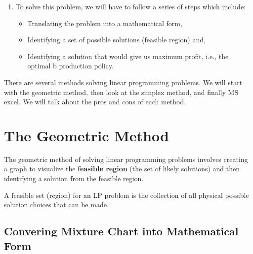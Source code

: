 \documentclass[
  letterpaper,
  DIV=11,
  numbers=noendperiod]{scrreprt}
\newenvironment{Shaded}{\begin{snugshade}}{\end{snugshade}}
\newcommand{\DataTypeTok}[1]{\textcolor[rgb]{0.68,0.00,0.00}{#1}}
\newcommand{\ErrorTok}[1]{\textcolor[rgb]{0.68,0.00,0.00}{#1}}
\newcommand{\KeywordTok}[1]{\textcolor[rgb]{0.00,0.23,0.31}{#1}}
\providecommand{\tightlist}{%
  \setlength{\itemsep}{0pt}\setlength{\parskip}{0pt}}\usepackage{longtable,booktabs,array}
\begin{document}
\begin{enumerate}
\def\labelenumi{\alph{enumi})}
\setcounter{enumi}{1}
\item
  To solve this problem, we will have to follow a series of steps which
  include:

  \begin{itemize}
  \tightlist
  \item
    Translating the problem into a mathematical form,
  \item
    Identifying a set of possible solutions (feasible region) and,
  \item
    Identifying a solution that would give us maximum profit, i.e., the
    optimal b production policy.
  \end{itemize}
\end{enumerate}

There are several methods solving linear programming problems. We will
start with the geometric method, then look at the simplex method, and
finally MS excel. We will talk about the pros and cons of each method.

\hypertarget{the-geometric-method}{%
\section{The Geometric Method}\label{the-geometric-method}}

The geometric method of solving linear programming problems involves
creating a graph to visualize the \textbf{feasible region} (the set of
likely solutions) and then identifying a solution from the feasible
region.

\begin{Shaded}
\begin{Highlighting}[]
\DataTypeTok{A} \DataTypeTok{feasible} \DataTypeTok{set} \ErrorTok{(}\DataTypeTok{region}\ErrorTok{)} \DataTypeTok{for} \DataTypeTok{an} \DataTypeTok{LP} \DataTypeTok{problem} \DataTypeTok{is} \DataTypeTok{the} \DataTypeTok{collection} \DataTypeTok{of} \DataTypeTok{all} \DataTypeTok{physical}
\DataTypeTok{possible} \DataTypeTok{solution} \DataTypeTok{choices} \DataTypeTok{that} \DataTypeTok{can} \DataTypeTok{be} \DataTypeTok{made}\KeywordTok{.} 
\end{Highlighting}
\end{Shaded}

\hypertarget{convering-mixture-chart-into-mathematical-form}{%
\subsection{Convering Mixture Chart into Mathematical
Form}\label{convering-mixture-chart-into-mathematical-form}}
\end{document}

